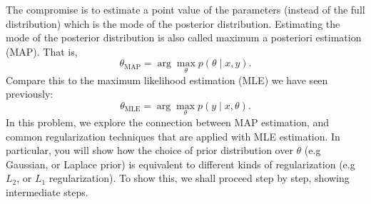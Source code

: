 \documentclass[11pt]{article}
\begin{document}
The compromise is to estimate a point value of the parameters (instead of the full distribution) which is the mode of the posterior distribution. Estimating the mode of the posterior distribution is also called maximum a posteriori estimation (MAP). That is,
\[\theta_{\mathrm{MAP}}=\arg\max_\theta p(\theta\mid x,y).\]
Compare this to the maximum likelihood estimation (MLE) we have seen previously:
\[\theta_{\mathrm{MLE}}=\arg\max_\theta p(y\mid x,\theta).\]
In this problem, we explore the connection between MAP estimation, and common regularization techniques that are applied with MLE estimation. In particular, you will show how the choice of prior distribution over $\theta$ (e.g Gaussian, or Laplace prior) is equivalent to different kinds of regularization (e.g $L_2$, or $L_1$ regularization). To show this, we shall proceed step by step, showing intermediate steps.
\end{document}

